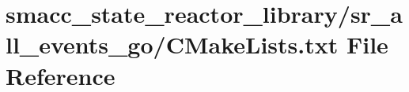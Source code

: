 \hypertarget{state__reactor__library_2sr__all__events__go_2CMakeLists_8txt}{}\section{smacc\+\_\+state\+\_\+reactor\+\_\+library/sr\+\_\+all\+\_\+events\+\_\+go/\+C\+Make\+Lists.txt File Reference}
\label{state__reactor__library_2sr__all__events__go_2CMakeLists_8txt}
